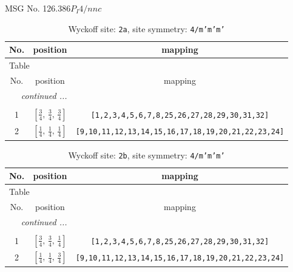 \documentclass[fleqn,8pt]{jsarticle}
\begin{document}
\setcounter{MaxMatrixCols}{32}

\renewcommand{\tablename}{Table~}
\renewcommand{\figurename}{Figure~}
\begin{center}
\LARGE
MSG No. 126.386\quad$P_{I}4/nnc$
\end{center}
\renewcommand{\arraystretch}{1.2}
\begin{longtable}{ccc}
\caption{Wyckoff site: {\tt 2a}, site symmetry: {\tt 4/m'm'm'}}
 \\
 \hline \hline
No. & position & mapping \\ \hline \endfirsthead

\multicolumn{2}{l}{\tablename\ \thetable{}} \\
 \hline \hline
No. & position & mapping \\ \hline \endhead

 \hline \hline
\multicolumn{2}{r}{\footnotesize\it continued ...} \\ \endfoot

 \hline \hline
\multicolumn{2}{r}{} \\ \endlastfoot

1 & $\left[ \frac{3}{4},\, \frac{3}{4},\, \frac{3}{4} \right]$ & {\tt [1,2,3,4,5,6,7,8,25,26,27,28,29,30,31,32]} \\ \hline
2 & $\left[ \frac{1}{4},\, \frac{1}{4},\, \frac{1}{4} \right]$ & {\tt [9,10,11,12,13,14,15,16,17,18,19,20,21,22,23,24]} \\
\end{longtable}
\renewcommand{\arraystretch}{1.2}
\begin{longtable}{ccc}
\caption{Wyckoff site: {\tt 2b}, site symmetry: {\tt 4/m'm'm'}}
 \\
 \hline \hline
No. & position & mapping \\ \hline \endfirsthead

\multicolumn{2}{l}{\tablename\ \thetable{}} \\
 \hline \hline
No. & position & mapping \\ \hline \endhead

 \hline \hline
\multicolumn{2}{r}{\footnotesize\it continued ...} \\ \endfoot

 \hline \hline
\multicolumn{2}{r}{} \\ \endlastfoot

1 & $\left[ \frac{3}{4},\, \frac{3}{4},\, \frac{1}{4} \right]$ & {\tt [1,2,3,4,5,6,7,8,25,26,27,28,29,30,31,32]} \\ \hline
2 & $\left[ \frac{1}{4},\, \frac{1}{4},\, \frac{3}{4} \right]$ & {\tt [9,10,11,12,13,14,15,16,17,18,19,20,21,22,23,24]} \\
\end{longtable}
\end{document}
